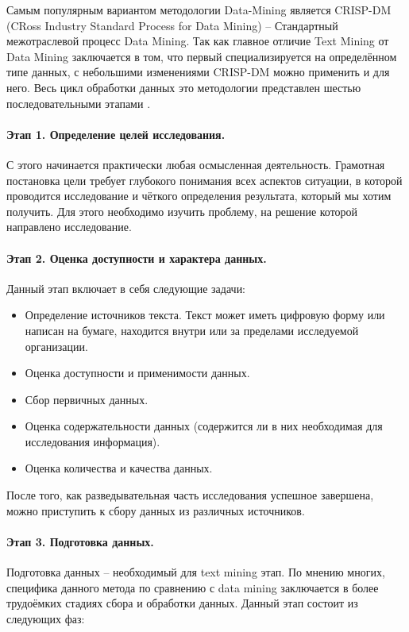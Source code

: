 Самым популярным вариантом методологии Data-Mining является CRISP-DM (CRoss Industry Standard Process for Data Mining) -- Стандартный межотраслевой процесс Data Mining. Так как главное отличие Text Mining от Data Mining заключается в том, что первый специализируется на определённом типе данных, с небольшими изменениями CRISP-DM можно применить и для него. Весь цикл обработки данных это методологии представлен шестью последовательными этапами \cite[стр. 74]{practical_tm}.

\paragraph{Этап 1. Определение целей исследования.} С этого начинается практически любая осмысленная деятельность. Грамотная постановка цели требует глубокого понимания всех аспектов ситуации, в которой проводится исследование и чёткого определения результата, который мы хотим получить. Для этого необходимо изучить проблему, на решение которой направлено исследование.

\paragraph{Этап 2. Оценка доступности и характера данных.} Данный этап включает в себя следующие задачи: 
	\begin{itemize}
	\item Определение источников текста. Текст может иметь цифровую форму или написан на бумаге, находится внутри или за пределами исследуемой организации.
	\item Оценка доступности и применимости данных.
	\item Сбор первичных данных.
	\item Оценка содержательности данных (содержится ли в них необходимая для исследования информация).
	\item Оценка количества и качества данных. 
	\end{itemize}

После того, как разведывательная часть исследования успешное завершена, можно приступить к сбору данных из различных источников.

\paragraph{Этап 3. Подготовка данных.} Подготовка данных -- необходимый для text mining этап. По мнению многих, специфика данного метода по сравнению с data mining заключается в более трудоёмких стадиях сбора и обработки данных\cite[стр. 77]{practical_tm}. Данный этап состоит из следующих фаз:

